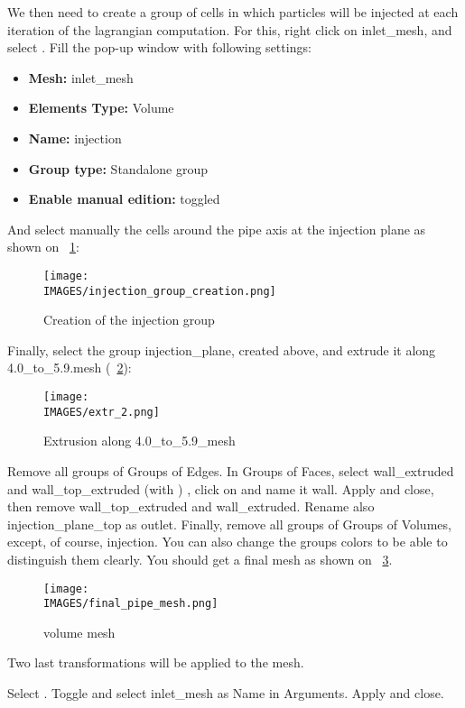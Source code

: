 We then need to create a group of cells in which particles will be injected at each iteration of the lagrangian computation.
For this, right click on inlet\_mesh, and select . Fill the pop-up window with following settings:
%
\begin{itemize}
	\item \textbf{Mesh:} inlet\_mesh
	\item \textbf{Elements Type:} Volume
	\item \textbf{Name:} injection
	\item \textbf{Group type:} Standalone group
	\item \textbf{Enable manual edition:} toggled
\end{itemize}
%
And select manually the cells around the pipe axis at the injection plane as shown on \figurename~\ref{lag:injection_volume}:
%
\begin{figure}[H]
	\centering
	\texttt{[image: \\IMAGES/injection\_group\_creation.png]}
	\caption{Creation of the injection group}
	\label{lag:injection_volume}
\end{figure}
%
Finally, select the group injection\_plane, created above, and extrude it along 4.0\_to\_5.9.mesh (\figurename~\ref{lag:extr_2}):
%
\begin{figure}[H]
	\centering
	\texttt{[image: \\IMAGES/extr\_2.png]}
	\caption{Extrusion along 4.0\_to\_5.9\_mesh}
	\label{lag:extr_2}
\end{figure}
%

Remove all groups of Groups of Edges. In Groups of Faces, select wall\_extruded and wall\_top\_extruded (with ) , click on  and name it wall.
Apply and close, then remove wall\_top\_extruded and wall\_extruded.
Rename also injection\_plane\_top as outlet. Finally, remove all groups of Groups of Volumes, except, of course, injection. You can also change the groups colors to be able to distinguish them clearly.
%
\clearpage
%
You should get a final mesh as shown on \figurename~\ref{lag:final}.
%
\begin{figure}[H]
	\centering
	\texttt{[image: \\IMAGES/final\_pipe\_mesh.png]}
	\caption{volume mesh}
	\label{lag:final}
\end{figure}
%

Two last transformations will be applied to the mesh.

Select .
Toggle  and select inlet\_mesh as Name in Arguments.
Apply and close.

